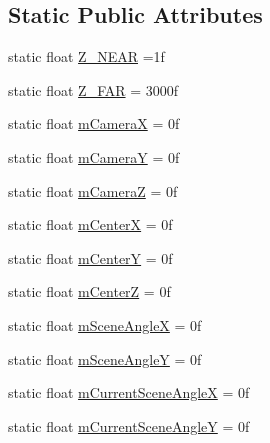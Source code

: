 \subsection*{Static Public Attributes}
\begin{DoxyCompactItemize}
\item 
static float \hyperlink{classandroid_1_1app_1_1printerapp_1_1viewer_1_1_viewer_renderer_a732d1e1af4d990e1a6f9e9195d0bd37e}{Z\+\_\+\+N\+E\+AR} =1f
\item 
static float \hyperlink{classandroid_1_1app_1_1printerapp_1_1viewer_1_1_viewer_renderer_a13ccec1d9151dbaea4d998dfcf6fcc1a}{Z\+\_\+\+F\+AR} = 3000f
\item 
static float \hyperlink{classandroid_1_1app_1_1printerapp_1_1viewer_1_1_viewer_renderer_a2ed2e2dc459d53d3c0ef31ee1f41185d}{m\+CameraX} = 0f
\item 
static float \hyperlink{classandroid_1_1app_1_1printerapp_1_1viewer_1_1_viewer_renderer_a16a198c579cda2404c349eb50368b61c}{m\+CameraY} = 0f
\item 
static float \hyperlink{classandroid_1_1app_1_1printerapp_1_1viewer_1_1_viewer_renderer_a54410a198554e632a2aaedf80d86e705}{m\+CameraZ} = 0f
\item 
static float \hyperlink{classandroid_1_1app_1_1printerapp_1_1viewer_1_1_viewer_renderer_a5bc0ab9baf6fb6b53edaff5665e1927b}{m\+CenterX} = 0f
\item 
static float \hyperlink{classandroid_1_1app_1_1printerapp_1_1viewer_1_1_viewer_renderer_a860c392de580193de7687f2f7d0270b1}{m\+CenterY} = 0f
\item 
static float \hyperlink{classandroid_1_1app_1_1printerapp_1_1viewer_1_1_viewer_renderer_ae1708f3a18f2e0a6a3da7fec8564cfdc}{m\+CenterZ} = 0f
\item 
static float \hyperlink{classandroid_1_1app_1_1printerapp_1_1viewer_1_1_viewer_renderer_ab139b7217910ca78c383af3a88038b57}{m\+Scene\+AngleX} = 0f
\item 
static float \hyperlink{classandroid_1_1app_1_1printerapp_1_1viewer_1_1_viewer_renderer_a8e1f86d3acb49fd8957676a3b611e10c}{m\+Scene\+AngleY} = 0f
\item 
static float \hyperlink{classandroid_1_1app_1_1printerapp_1_1viewer_1_1_viewer_renderer_acf38fe36f0213d400d6a8ef714ee7fd6}{m\+Current\+Scene\+AngleX} = 0f
\item 
static float \hyperlink{classandroid_1_1app_1_1printerapp_1_1viewer_1_1_viewer_renderer_a5a4dff5c270e948c2c5c9a4ae8094d43}{m\+Current\+Scene\+AngleY} = 0f
\item 

\end{DoxyCompactItemize}
